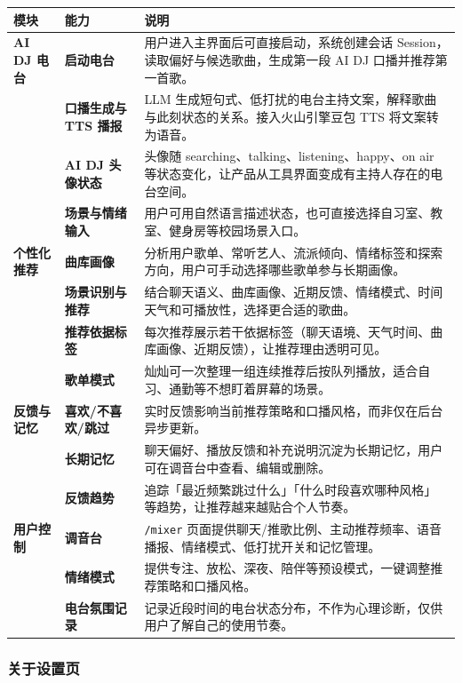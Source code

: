 \documentclass[UTF8,a4paper,11pt,fontset=windows]{ctexart}
\begin{document}
\begin{longtable}{>{\bfseries}p{2.3cm}>{\bfseries}p{2.8cm}p{9.5cm}}
\toprule
模块 & 能力 & 说明 \\
\midrule
\endfirsthead
\bottomrule
\endhead
AI DJ 电台 & 启动电台 & 用户进入主界面后可直接启动，系统创建会话 Session，读取偏好与候选歌曲，生成第一段 AI DJ 口播并推荐第一首歌。 \\
& 口播生成与 TTS 播报 & LLM 生成短句式、低打扰的电台主持文案，解释歌曲与此刻状态的关系。接入火山引擎豆包 TTS 将文案转为语音。 \\
& AI DJ 头像状态 & 头像随 searching、talking、listening、happy、on air 等状态变化，让产品从工具界面变成有主持人存在的电台空间。 \\
& 场景与情绪输入 & 用户可用自然语言描述状态，也可直接选择自习室、教室、健身房等校园场景入口。 \\
\midrule
个性化推荐 & 曲库画像 & 分析用户歌单、常听艺人、流派倾向、情绪标签和探索方向，用户可手动选择哪些歌单参与长期画像。 \\
& 场景识别与推荐 & 结合聊天语义、曲库画像、近期反馈、情绪模式、时间天气和可播放性，选择更合适的歌曲。 \\
& 推荐依据标签 & 每次推荐展示若干依据标签（聊天语境、天气时间、曲库画像、近期反馈），让推荐理由透明可见。 \\
& 歌单模式 & 灿灿可一次整理一组连续推荐后按队列播放，适合自习、通勤等不想盯着屏幕的场景。 \\
\midrule
反馈与记忆 & 喜欢/不喜欢/跳过 & 实时反馈影响当前推荐策略和口播风格，而非仅在后台异步更新。 \\
& 长期记忆 & 聊天偏好、播放反馈和补充说明沉淀为长期记忆，用户可在调音台中查看、编辑或删除。 \\
& 反馈趋势 & 追踪「最近频繁跳过什么」「什么时段喜欢哪种风格」等趋势，让推荐越来越贴合个人节奏。 \\
\midrule
用户控制 & 调音台 & \texttt{/mixer} 页面提供聊天/推歌比例、主动推荐频率、语音播报、情绪模式、低打扰开关和记忆管理。 \\
& 情绪模式 & 提供专注、放松、深夜、陪伴等预设模式，一键调整推荐策略和口播风格。 \\
& 电台氛围记录 & 记录近段时间的电台状态分布，不作为心理诊断，仅供用户了解自己的使用节奏。 \\
\bottomrule
\end{longtable}


\subsubsection*{关于设置页}
\end{document}
